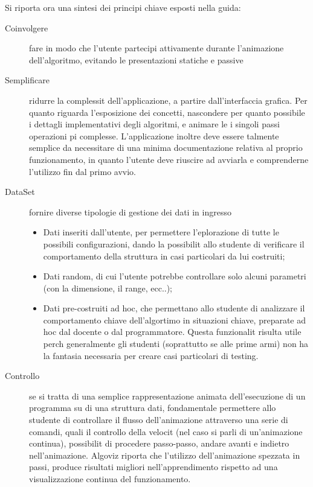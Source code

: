 Si riporta ora una sintesi dei principi chiave esposti nella guida:
\begin{description}
\item [{Coinvolgere}] fare in modo che l'utente partecipi attivamente durante
l'animazione dell'algoritmo, evitando le presentazioni statiche e
passive
\item [{Semplificare}] ridurre la complessit dell'applicazione, a partire
dall'interfaccia grafica. Per quanto riguarda l'esposizione dei concetti,
nascondere per quanto possibile i dettagli implementativi degli algoritmi,
e animare le i singoli passi operazioni pi complesse. L'applicazione
inoltre deve essere talmente semplice da necessitare di una minima
documentazione relativa al proprio funzionamento, in quanto l'utente
deve riuscire ad avviarla e comprenderne l'utilizzo fin dal primo
avvio.
\item [{DataSet}] fornire diverse tipologie di gestione dei dati in ingresso

\begin{itemize}
\item Dati inseriti dall'utente, per permettere l'eplorazione di tutte le
possibili configurazioni, dando la possibilit allo studente di verificare
il comportamento della struttura in casi particolari da lui costruiti;
\item Dati random, di cui l'utente potrebbe controllare solo alcuni parametri
(con la dimensione, il range, ecc..);
\item Dati pre-costruiti ad hoc, che permettano allo studente di analizzare
il comportamento chiave dell'algortimo in situazioni chiave, preparate
ad hoc dal docente o dal programmatore. Questa funzionalit risulta
utile perch generalmente gli studenti (soprattutto se alle prime
armi) non ha la fantasia necessaria per creare casi particolari di
testing. 
\end{itemize}
\item [{Controllo}] se si tratta di una semplice rappresentazione animata
dell'esecuzione di un programma su di una struttura dati,  fondamentale
permettere allo studente di controllare il flusso dell'animazione
attraverso una serie di comandi, quali il controllo della velocit
(nel caso si parli di un'animazione continua), possibilit di procedere
passo-passo, andare avanti e indietro nell'animazione. Algoviz riporta
che l'utilizzo dell'animazione spezzata in passi, produce risultati
migliori nell'apprendimento rispetto ad una visualizzazione continua
del funzionamento.
\end{description}

